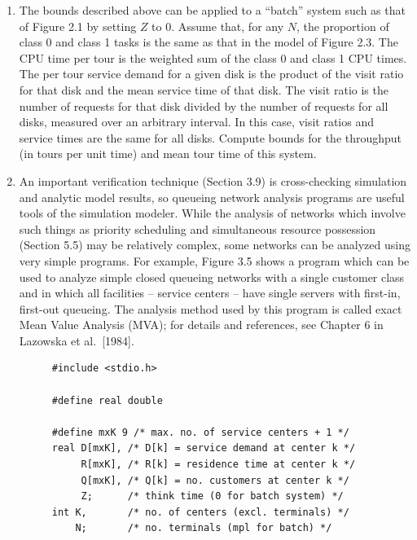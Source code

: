 \begin{enumerate}
Plot the throughput and response time bounds for the timesharing model of
problem 3, Chapter 2 for $N$ in the range 1 to 24. Locate the throughput and
response time values obtained from simulation on this plot. Assume that the
CPU in this system is replaced by a CPU of twice the speed, and plot response
 time bounds again.

\item The bounds described above can be applied to a ``batch'' system such as
that of Figure 2.1 by setting $Z$ to 0. Assume that, for any $N$, the
proportion of class 0 and class 1 tasks is the same as that in the model of
Figure 2.3. The CPU time per tour is the weighted sum of the class 0 and class
1 CPU times. The per tour service demand for a given disk is the product of
the visit ratio for that disk and the mean service time of that disk. The visit
ratio is the number of requests for that disk divided by the number of
requests for all disks, measured over an arbitrary interval. In this case,
visit ratios and service times are the same for all disks. Compute bounds for
the throughput (in tours per unit time) and mean tour time of this system.

\item An important verification technique (Section 3.9) is cross-checking
simulation and analytic model results, so queueing network analysis programs
are useful tools of the simulation modeler. While the analysis of networks
which involve such things as priority scheduling and simultaneous resource
possession (Section 5.5) may be relatively complex, some networks can be
analyzed using very simple programs. For example, Figure 3.5 shows a program
which can be used to analyze simple closed queueing networks with a single
customer class and in which all facilities -- service centers -- have single
servers with first-in, first-out queueing. The analysis method used by this
program is called exact Mean Value Analysis (MVA); for details and references,
see Chapter 6 in Lazowska et al.\ [1984].

\begin{figure}[ht]
\centering
\begingroup\small
\begin{verbatim}
#include <stdio.h>

#define real double

#define mxK 9 /* max. no. of service centers + 1 */
real D[mxK], /* D[k] = service demand at center k */
     R[mxK], /* R[k] = residence time at center k */
     Q[mxK], /* Q[k] = no. customers at center k */
     Z;      /* think time (0 for batch system) */
int K,       /* no. of centers (excl. terminals) */
    N;       /* no. terminals (mpl for batch) */


\end{verbatim}
\end{figure}
\end{enumerate}
